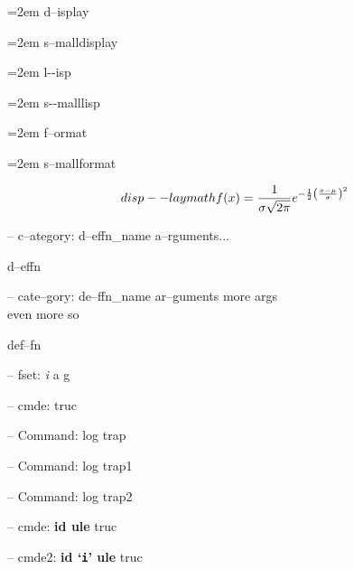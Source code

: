 \documentclass{book}
\begin{document}
\par\begingroup\obeylines\obeyspaces\frenchspacing\leftskip=2em\relax\parskip=0pt\relax{}%
d--isplay
\endgroup{}%

\par\begingroup\obeylines\obeyspaces\frenchspacing\leftskip=2em\relax\parskip=0pt\relax\footnotesize{}%
s--malldisplay
\endgroup{}%

\par\begingroup\obeylines\obeyspaces\frenchspacing\leftskip=2em\relax\parskip=0pt\relax\ttfamily{}%
l{-}{-}isp
\endgroup{}%

\par\begingroup\obeylines\obeyspaces\frenchspacing\leftskip=2em\relax\parskip=0pt\relax\ttfamily\footnotesize{}%
s{-}{-}malllisp
\endgroup{}%

\par\begingroup\obeylines\obeyspaces\frenchspacing\leftskip=2em\relax\parskip=0pt\relax{}%
f--ormat
\endgroup{}%

\par\begingroup\obeylines\obeyspaces\frenchspacing\leftskip=2em\relax\parskip=0pt\relax\footnotesize{}%
s--mallformat
\endgroup{}%

$$
disp--laymath
f(x) = {1 \over \sigma \sqrt{2\pi}}e^{-{1 \over 2}\left({x-\mu \over \sigma}\right)^2}
$$

\hbox{}-- c--ategory: d--effn\_name a--rguments...


%
d--effn

\hbox{}-- cate--gory: de--ffn\_name ar--guments    more args \leavevmode{}\\ even more so


%
def--fn

\hbox{}-- fset: \emph{i} a g


%
%
\hbox{}-- cmde: truc 


%
\hbox{}-- Command: log trap 


%
\hbox{}-- Command: log trap1 


%
\hbox{}-- Command: log trap2 


%
\hbox{}-- cmde: \textbf{id ule} truc


%
\hbox{}-- cmde2: \textbf{id `\texttt{i}' ule} truc
\end{document}
